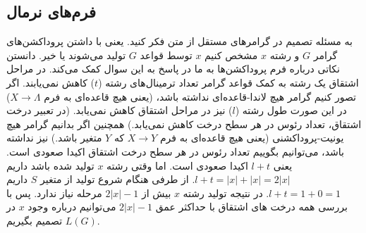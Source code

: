 \documentclass[main.tex]{subfiles}
\begin{document}
	\subsection{فرم‌های نرمال}
	به مسئله تصمیم در گرامر‌های مستقل از متن فکر کنید. یعنی با داشتن پروداکشن‌های گرامر $G$ و رشته $x$ مشخص کنیم $x$ توسط قواعد $G$ تولید می‌شوند یا خیر.  دانستن نکاتی درباره فرم پروداکشن‌ها به ما در پاسخ به این سوال کمک می‌کند. در مراحل اشتقاق
	یک رشته به کمک قواعد گرامر تعداد ترمینال‌های رشته ($t$) کاهش نمی‌یابند. اگر تصور کنیم گرامر هیچ لاندا-قاعده‌ای
	 نداشته باشد، (یعنی هیچ قاعده‌ای به فرم 
	 $X \rightarrow \Lambda$)
	 در این صورت طول رشته ($l$) نیز در مراحل اشتقاق کاهش نمی‌یابد. (در تعبیر درخت اشتقاق، تعداد رئوس در هر سطح درخت کاهش نمی‌یابد.) همچنین اگر بدانیم گرامر هیچ یونیت-پروداکشنی 
	 (یعنی هیچ قاعده‌ای به فرم
	 $X \rightarrow Y$
	 که $Y$ متغیر باشد.)
	 نیز نداشته باشد، می‌توانیم بگوییم تعداد رئوس در هر سطح درخت اشتقاق اکیدا صعودی است. یعنی $l+ t$ اکیدا صعودی است. اما وقتی رشته $x$ تولید شده باشد داریم 
	 $l + t = |x| + |x| = 2|x|$.
	 از طرفی هنگام شروع تولید از متغیر $S$ داریم
	 $l + t = 1 + 0 = 1$.
	 در نتیجه تولید رشته $x$ بیش از
	 $2|x| - 1$
	 مرحله نیاز ندارد. پس با بررسی همه درخت های اشتقاق با حداکثر عمق 
	 $2|x| - 1$
	 می‌توانیم درباره وجود $x$ در 
	 $L(G)$
	 تصمیم بگیریم.
	 
\end{document}
